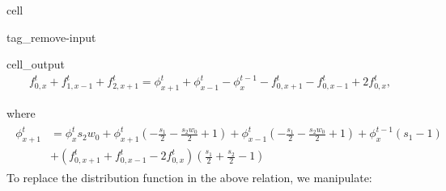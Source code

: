 \documentclass[letterpaper,10pt,english,openany,oneside]{jupyterBook}
\begin{document}
\begin{sphinxuseclass}{cell}
\begin{sphinxuseclass}{tag_remove-input}\begin{sphinxVerbatimOutput}

\begin{sphinxuseclass}{cell_output}\begin{equation*}
\begin{split}\displaystyle f_{0,x}^{t} + f_{1,x-1}^{t} + f_{2,x+1}^{t} = \phi_{x+1}^t + \phi_{x-1}^t - \phi_{x}^{t-1} - f_{0,x+1}^{t} - f_{0,x-1}^{t} + 2 f_{0,x}^{t},\end{split}
\end{equation*}
\end{sphinxuseclass}\end{sphinxVerbatimOutput}

\end{sphinxuseclass}
\end{sphinxuseclass}
\sphinxAtStartPar
where
\begin{equation}\label{equation:Refs/LBM-Study/FDM-Belloti/FDM-LBM-Diffusive:rel-pre-shift-2}
\begin{split}
\begin{array}{ll}
\phi_{x+1}^t & = \phi^{t}_{x} s_{2} w_{0} + \phi_{x+1}^t \left(- \displaystyle\frac{s_{1}}{2} - \frac{s_{2} w_{0}}{2} + 1\right) + \phi_{x-1}^t \left(- \displaystyle\frac{s_{1}}{2} - \frac{s_{2} w_{0}}{2} + 1\right) + \phi_{x}^{t-1} \left(s_{1} - 1\right) \\
& + \left(f_{0,x+1}^{t} + f_{0,x-1}^{t} - 2 f_{0,x}^{t}\right) \left(\displaystyle\frac{s_{1}}{2} + \frac{s_{2}}{2} - 1\right)
\end{array}
\end{split}
\end{equation}
\sphinxAtStartPar
To replace the distribution function in the above relation, we manipulate:
\end{document}
